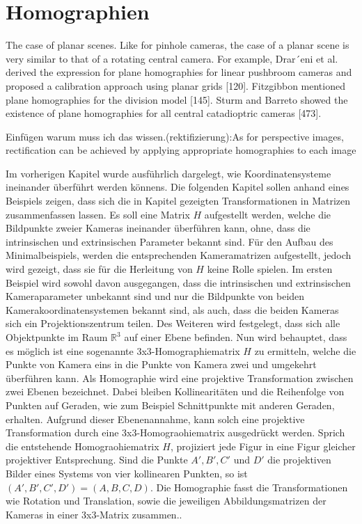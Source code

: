 \chapter{Homographien}
\label{sec:homographien} 


The case of planar scenes. Like for pinhole cameras, the case of
a planar scene is very similar to that of a rotating central camera. For
example, Drar´eni et al. derived the expression for plane homographies
for linear pushbroom cameras and proposed a calibration approach
using planar grids [120]. Fitzgibbon mentioned plane homographies for
the division model [145]. Sturm and Barreto showed the existence of
plane homographies for all central catadioptric cameras [473].\cite{CamerModels.}

Einfügen warum muss ich das wissen.(rektifizierung):As for perspective images,
rectification can be achieved by applying appropriate homographies to
each image\cite{CamerModels.}

Im vorherigen Kapitel  wurde ausführlich dargelegt, wie Koordinatensysteme ineinander überführt werden könnens. Die folgenden Kapitel sollen anhand eines Beispiels zeigen, dass sich die in Kapitel  gezeigten Transformationen in Matrizen zusammenfassen lassen. Es soll eine Matrix $H$ aufgestellt werden, welche die Bildpunkte zweier Kameras ineinander überführen kann, ohne, dass die intrinsischen und extrinsischen Parameter bekannt sind. Für den Aufbau des Minimalbeispiels, werden die entsprechenden Kameramatrizen aufgestellt, jedoch wird gezeigt, dass sie für die Herleitung von $H$ keine Rolle spielen. Im ersten Beispiel wird sowohl davon ausgegangen, dass die intrinsischen und extrinsischen Kameraparameter unbekannt sind und nur die Bildpunkte von beiden Kamerakoordinatensystemen bekannt sind, als auch, dass die beiden Kameras sich ein Projektionszentrum teilen.  Des Weiteren wird festgelegt, dass sich alle Objektpunkte im Raum $\mathbb{R}^3$ auf einer Ebene befinden. Nun wird behauptet, dass es möglich ist eine sogenannte 3x3-Homographiematrix $H$ zu ermitteln, welche die Punkte von Kamera eins in die Punkte von Kamera zwei und umgekehrt überführen kann. Als Homographie wird eine projektive Transformation zwischen zwei Ebenen bezeichnet. Dabei bleiben Kollinearitäten und die Reihenfolge von Punkten auf Geraden, wie zum Beispiel Schnittpunkte mit anderen Geraden, erhalten. Aufgrund dieser Ebenenannahme, kann solch eine projektive Transformation durch eine 3x3-Homograohiematrix ausgedrückt werden\cite{Roser}. Sprich die entstehende Homograohiematrix $H$, projiziert jede Figur in eine Figur gleicher projektiver Entsprechung\cite{HZ,Elements}. Sind die Punkte $A',B',C'$ und $D'$ die projektiven Bilder eines Systems von vier kollinearen Punkten, so ist $(A',B',C',D') = (A,B,C,D)$\cite{Peiffer}. Die Homographie fasst die Transformationen wie Rotation und Translation, sowie die jeweiligen Abbildungsmatrizen der Kameras in einer 3x3-Matrix zusammen.\cite{Elements,Peiffer}.
 
